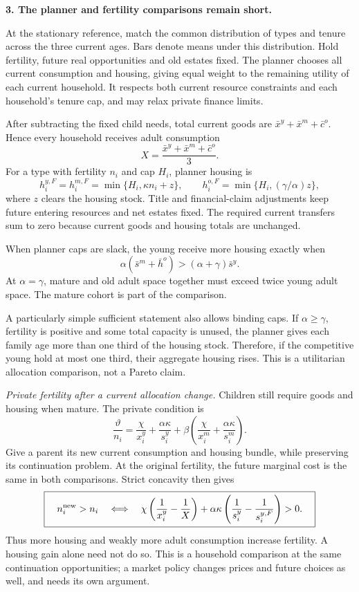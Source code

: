 \documentclass[11pt]{article}
\begin{document}
\newpage
\textbf{3. The planner and fertility comparisons remain short.}

At the stationary reference, match the common distribution of types and tenure
across the three current ages. Bars denote means under this distribution.
Hold fertility, future real opportunities and old estates fixed. The planner
chooses all current consumption and housing, giving equal weight to the
remaining utility of each current household. It respects both current resource
constraints and each household's tenure cap, and may relax private finance limits.

After subtracting the fixed child needs, total current goods are
$\bar x^y+\bar x^m+\bar c^o$. Hence every household receives adult consumption
\[
X=\frac{\bar x^y+\bar x^m+\bar c^o}{3}.
\]
For a type with fertility $n_i$ and cap $H_i$, planner housing is
\[
h_i^{y,F}=h_i^{m,F}=\min\{H_i,\kappa n_i+z\},\qquad
h_i^{o,F}=\min\{H_i,(\gamma/\alpha)z\},
\]
where $z$ clears the housing stock. Title and financial-claim adjustments keep
future entering resources and net estates fixed. The required current transfers
sum to zero because current goods and housing totals are unchanged.

When planner caps are slack, the young receive more housing exactly when
\[
\boxed{\quad
\alpha(\bar s^m+\bar h^o)>(\alpha+\gamma)\bar s^y.
\quad}
\]
At $\alpha=\gamma$, mature and old adult space together must exceed twice
young adult space. The mature cohort is part of the comparison.

A particularly simple sufficient statement also allows binding caps. If
$\alpha\ge\gamma$, fertility is positive and some total capacity is unused,
the planner gives each family age more than one third of the housing stock.
Therefore, if the competitive young hold at most one third, their aggregate
housing rises. This is a utilitarian allocation comparison, not a Pareto claim.

\textit{Private fertility after a current allocation change.}
Children still require goods and housing when mature. The private condition is
\[
\frac{\vartheta}{n_i}
=\frac\chi{x_i^y}+\frac{\alpha\kappa}{s_i^y}
+\beta\left(\frac\chi{x_i^m}+\frac{\alpha\kappa}{s_i^m}\right).
\]
Give a parent its new current consumption and housing bundle, while preserving
its continuation problem. At the original fertility, the future marginal cost
is the same in both comparisons. Strict concavity then gives
\[
\boxed{\quad n_i^{\rm new}>n_i
\quad\Longleftrightarrow\quad
\chi\left(\frac1{x_i^y}-\frac1X\right)
+\alpha\kappa\left(\frac1{s_i^y}-\frac1{s_i^{y,F}}\right)>0.\quad}
\]
Thus more housing and weakly more adult consumption increase fertility.
A housing gain alone need not do so. This is a household comparison at the
same continuation opportunities; a market policy changes prices and future
choices as well, and needs its own argument.
\end{document}
